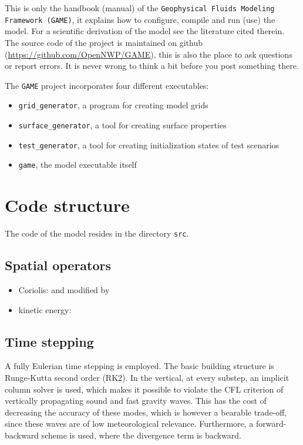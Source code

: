 \documentclass[10pt]{report}
\begin{document}
This is only the handbook (manual) of the \texttt{Geophysical Fluids Modeling Framework (GAME)}, it explains how to configure, compile and run (use) the model. For a scientific derivation of the model see the literature cited therein. The source code of the project is maintained on github (\url{https://github.com/OpenNWP/GAME}), this is also the place to ask questions or report errors. It is never wrong to think a bit before you post something there.

The \texttt{GAME} project incorporates four different executables:

\begin{itemize}
\item \texttt{grid\_generator}, a program for creating model grids
\item \texttt{surface\_generator}, a tool for creating surface properties
\item \texttt{test\_generator}, a tool for creating initialization states of test scenarios
\item \texttt{game}, the model executable itself
\end{itemize}

\chapter{Code structure}
\label{chap:code_structure}

The code of the model resides in the directory \texttt{src}.

\section{Spatial operators}
\label{sec:spatial_operators}

\begin{itemize}
\item Coriolis: \cite{thuburn_f_discrete_plane} and \cite{ringler_trsk} modified by \cite{doi:10.1002/qj.3294}
\item kinetic energy: \cite{doi:10.1002/qj.1960}
\end{itemize}

\section{Time stepping}
\label{sec:time_stepping}

A fully Eulerian time stepping is employed. The basic building structure is Runge-Kutta second order (RK2). In the vertical, at every substep, an implicit column solver is used, which makes it possible to violate the CFL criterion of vertically propagating sound and fast gravity waves. This has the cost of decreasing the accuracy of these modes, which is however a bearable trade-off, since these waves are of low meteorological relevance. Furthermore, a forward-backward scheme is used, where the divergence term is backward.
\end{document}
